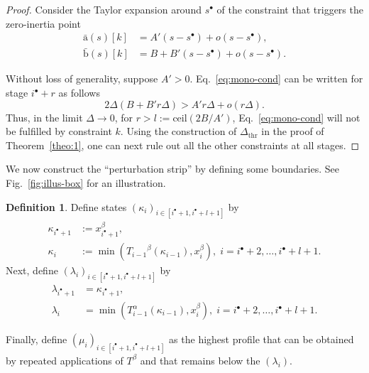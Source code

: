 \documentclass[journal]{IEEEtran}
\theoremstyle{plain}
\theoremstyle{definition}
\newtheorem{definition2}{Definition}
\newenvironment{definition}
  {\renewcommand{\qedsymbol}{$\lozenge$}
   \pushQED{\qed}\begin{definition2}}
  {\popQED\end{definition2}}
\theoremstyle{definition}
\renewcommand{\vec}[1]{\bm{\mathrm{#1}}}  %
\begin{document}
\begin{proof}
  Consider the Taylor expansion around $s^\bullet$ of the
  constraint that triggers the zero-inertia point
  \begin{equation*}
    \begin{aligned}
      \bar{\vec a}(s)[k] &= A'(s - s^\bullet) + o(s - s^\bullet), \\
      \bar{\vec b}(s)[k] &= B + B'(s - s^\bullet) + o(s - s^\bullet).
    \end{aligned}
  \end{equation*}

  Without loss of generality, suppose $A' > 0$.
  Eq.~\eqref{eq:mono-cond} can be written for stage
  $i^\bullet+r$ as follows
  \begin{equation*}
    2\Delta(B + B'r\Delta) > A' r \Delta + o(r\Delta).
  \end{equation*}
  Thus, in the limit $\Delta\to 0$, for
  $r> l := \mathrm{ceil}(2 B / A')$, Eq.~\eqref{eq:mono-cond}
  will not be fulfilled by constraint $k$. Using the construction of
  $\Delta_\mathrm{thr}$ in the proof of Theorem~\ref{theo:1}, one can
  next rule out all the other constraints at all stages.
\end{proof}


We now construct the ``perturbation strip'' by defining some
boundaries. See Fig.~\ref{fig:illus-box} for an illustration.

\begin{definition}
  Define states $(\kappa_i)_{i\in[i^\bullet+1,i^\bullet+l+1]}$ by
  \begin{equation*}
    \begin{aligned}
      \kappa_{i^\bullet+1}&:= x^\beta_{i^\bullet+1}, \\
      \kappa_i &:= \min ({T_{i-1}}^{\beta}(\kappa_{i-1}), x^\beta_i), \; i=i^\bullet+2, \dots, i^\bullet+l+1.
    \end{aligned}
  \end{equation*}
  Next, define $(\lambda_i)_{i\in[i^\bullet+1,i^\bullet+l+1]}$ by
  \begin{equation*}
    \begin{aligned}
      \lambda_{i^\bullet + 1} &= \kappa_{i^\bullet+1}, \\
      \lambda_i &= \min (T_{i-1}^{\alpha}(\kappa_{i-1}), x^\beta_i), \; i=i^\bullet+2, \dots, i^\bullet+l+1.
    \end{aligned}
  \end{equation*}

  Finally, define $(\mu_i)_{i\in[i^\bullet+1,i^\bullet+l+1]}$ as the
  highest profile that can be obtained by repeated applications of
  $T^\beta$ and that remains below the $(\lambda_i)$.
\end{definition}
\end{document}
